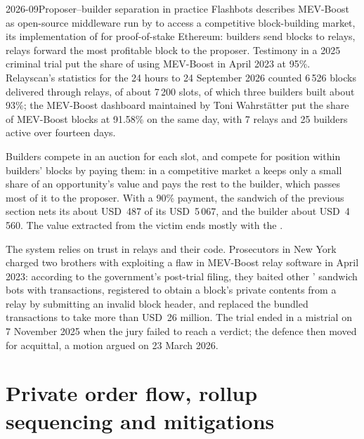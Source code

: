 \begin{dated}{2026-09}{Proposer--builder separation in practice}\label{dat:m3:maximal-extractable-value:boost}
Flashbots describes MEV-Boost as open-source middleware run by  to access a competitive block-building market, its implementation of
 for proof-of-stake Ethereum: builders send blocks to relays, relays forward the most profitable block to the proposer.
Testimony in a 2025 criminal trial put the share of  using MEV-Boost in April 2023 at 95\%. Relayscan's statistics for the 24 hours to 24
September 2026 counted 6\,526 blocks delivered through relays, of about 7\,200 slots, of which three builders built about 93\%; the
MEV-Boost dashboard maintained by Toni Wahrstätter put the share of MEV-Boost blocks at 91.58\% on the same day, with 7 relays and 25
builders active over fourteen days.
\end{dated}

Builders compete in an auction for each slot, and  compete for position within builders' blocks by paying them: in a competitive market a
 keeps only a small share of an opportunity's value and pays the rest to the builder, which passes most of it to the proposer. With a 90\%
payment, the sandwich of the previous section nets its  about USD~487 of its USD~5\,067, and the builder about USD~4\,560. The value
extracted from the victim ends mostly with the .

The system relies on trust in relays and their code. Prosecutors in New York charged two brothers with exploiting a flaw in MEV-Boost relay software in
April 2023: according to the government's post-trial filing, they baited other ' sandwich bots with transactions, registered  to
obtain a block's private contents from a relay by submitting an invalid block header, and replaced the bundled transactions to take more than USD~26
million. The trial ended in a mistrial on 7 November 2025 when the jury failed to reach a verdict; the defence then moved for acquittal, a motion
argued on 23 March 2026.

\section{Private order flow, rollup sequencing and mitigations}

